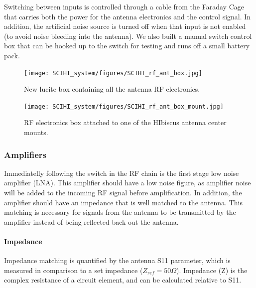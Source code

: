 Switching between inputs is controlled through a cable from the Faraday Cage that carries both the power for the antenna electronics and the control signal. In addition, the artificial noise source is turned off when that input is not enabled (to avoid noise bleeding into the antenna). We also built a manual switch control box that can be hooked up to the switch for testing and runs off a small battery pack. 

\begin{figure}[htb]
\centering
\begin{minipage}[b]{0.47\textwidth}
\centering
\texttt{[image: SCIHI\_system/figures/SCIHI\_rf\_ant\_box.jpg]}
\caption{New lucite box containing all the antenna RF electronics.}
\label{Fig:rf_ant_box}
\end{minipage}%
\begin{minipage}[b]{0.02\textwidth}
\hspace{1cm}
\end{minipage}%
\begin{minipage}[b]{0.47\textwidth}
\centering
\texttt{[image: SCIHI\_system/figures/SCIHI\_rf\_ant\_box\_mount.jpg]}
\caption{RF electronics box attached to one of the HIbiscus antenna center mounts.}
\label{Fig:rf_ant_mount}
\end{minipage}
\end{figure}

\subsubsection{Amplifiers} \label{Sec:Amp}
Immediatelly following the switch in the RF chain is the first stage low noise amplifier (LNA). This amplifier should have a low noise figure, as amplifier noise will be added to the incoming RF signal before amplification. In addition, the amplifier should have an impedance that is well matched to the antenna. This matching is necessary for signals from the antenna to be transmitted by the amplifier instead of being reflected back out the antenna. 


\paragraph{Impedance} 
Impedance matching is quantified by the antenna S11 parameter, which is measured in comparison to a set impedance ($Z_{ref}= 50 \Omega$). Impedance (Z) is the complex resistance of a circuit element, and can be calculated relative to S11.  \cite{rogers_2012} 

